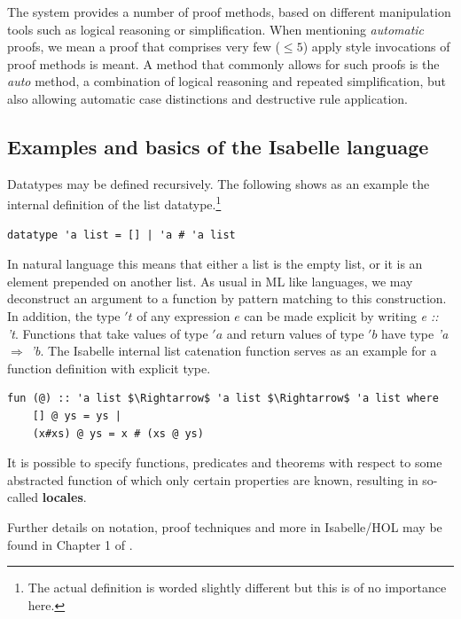 The system provides a number of proof methods,
based on different manipulation tools
such as logical reasoning or simplification.
When mentioning \textit{automatic} proofs, we mean a proof that
comprises very few ($\le 5$) apply style
invocations of proof methods is meant.
A method that commonly allows for such proofs is the \textit{auto} method,
a combination of logical reasoning and repeated simplification,
but also allowing automatic case distinctions and destructive rule application.

\subsection{Examples and basics of the Isabelle language}

Datatypes may be defined recursively.
The following shows as an example the internal definition of the list datatype.\footnote{
    The actual definition is worded slightly different but this is of no importance here.
}

\begin{lstlisting}[mathescape=true, language=Isabelle,label=lst:list-def]
datatype 'a list = [] | 'a # 'a list
\end{lstlisting}

In natural language this means that either a list is the empty list,
or it is an element prepended on another list.
As usual in ML like languages, we may deconstruct an argument to a function
by pattern matching to this construction.
In addition, the type $'t$ of any expression $e$ can be
made explicit by writing \textit{e :: 't}.
Functions that take values of type $'a$ and return values of type $'b$ 
have type \textit{'a $\Rightarrow$ 'b}.
The Isabelle internal list catenation function serves as
an example for a function definition with explicit type.

\begin{lstlisting}[mathescape=true, language=Isabelle,label=lst:append-def]
fun (@) :: 'a list $\Rightarrow$ 'a list $\Rightarrow$ 'a list where
    [] @ ys = ys |
    (x#xs) @ ys = x # (xs @ ys)
\end{lstlisting}

It is possible to specify functions, predicates
and theorems with respect to some abstracted function
of which only certain properties are known,
resulting in so-called \textbf{locales}.

Further details on notation, proof techniques and more in Isabelle/HOL
may be found in Chapter 1 of \parencite{DBLP:books/sp/NipkowK14}.



